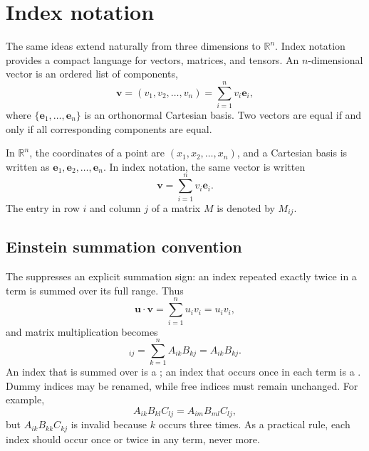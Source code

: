 \section{Index notation}
The same ideas extend naturally from three dimensions to $\mathbb{R}^n$. Index notation provides a compact language for vectors, matrices, and tensors. An $n$-dimensional vector is an ordered list of components,
\begin{equation}
    \mathbf{v}=(v_1,v_2,\ldots,v_n)
    =\sum_{i=1}^{n}v_i\mathbf{e}_i,
\end{equation}
where $\{\mathbf{e}_1,\ldots,\mathbf{e}_n\}$ is an orthonormal Cartesian basis. Two vectors are equal if and only if all corresponding components are equal.

In $\mathbb{R}^n$, the coordinates of a point are $(x_1,x_2,\ldots,x_n)$, and a Cartesian basis is written as $\mathbf{e}_1,\mathbf{e}_2,\ldots,\mathbf{e}_n$. In index notation, the same vector is written
\begin{equation}
\mathbf{v}=\sum_{i=1}^{n}v_i\mathbf{e}_i.
\end{equation}
The entry in row $i$ and column $j$ of a matrix $M$ is denoted by $M_{ij}$.

\subsection{Einstein summation convention}
The  suppresses an explicit summation sign: an index repeated exactly twice in a term is summed over its full range. Thus
\begin{equation}
\mathbf{u}\cdot\mathbf{v}=\sum_{i=1}^{n}u_iv_i=u_iv_i,
\end{equation}
and matrix multiplication becomes
\begin{equation}
[AB]_{ij}=\sum_{k=1}^{n}A_{ik}B_{kj}=A_{ik}B_{kj}.
\end{equation}
An index that is summed over is a ; an index that occurs once in each term is a . Dummy indices may be renamed, while free indices must remain unchanged. For example,
\begin{equation}
A_{ik}B_{kl}C_{lj}=A_{im}B_{ml}C_{lj},
\end{equation}
but $A_{ik}B_{kk}C_{kj}$ is invalid because $k$ occurs three times. As a practical rule, each index should occur once or twice in any term, never more.

